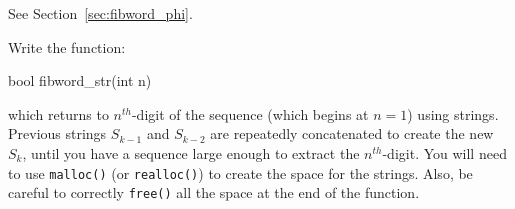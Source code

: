 

See Section~\ref{sec:fibword_phi}.

\begin{exercise}
Write the function:
\begin{codesnippet}
bool fibword_str(int n)
\end{codesnippet}
which returns to $n^{th}$-digit of the sequence (which begins at $n=1$)
using strings. Previous strings
$S_{k-1}$ and $S_{k-2}$
are repeatedly concatenated to create the new $S_k$, until you have a sequence
large enough to extract the $n^{th}$-digit. 
You will need to use \verb^malloc()^ (or \verb^realloc()^) to create the space
for the strings. Also, be careful to correctly \verb^free()^
all the space at the end of the function.
\end{exercise}
